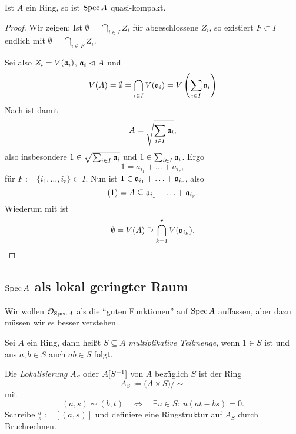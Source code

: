 \begin{satz}
	Ist $A$ ein Ring, so ist $\operatorname{Spec} A$ quasi-kompakt.
\end{satz}
\begin{proof}
	Wir zeigen: Ist $\emptyset = \bigcap_{i\in I} Z_i$ für abgeschlossene
	$Z_i$, so existiert $F\subset I$ endlich mit
	$\emptyset = \bigcap_{i\in F} Z_i$.
	
	Sei also $Z_i = V(\mathfrak{a}_i)$, $\mathfrak{a}_i \vartriangleleft A$ und
	\[
		V(A) = \emptyset = \bigcap_{i\in I} V(\mathfrak{a}_i)
		= V\left(\sum_{i\in I} \mathfrak{a}_i\right)
	\]
	Nach  ist damit
	\[
		A = \sqrt{\sum_{i\in I} \mathfrak{a}_i},
	\]
	also insbesondere $1 \in \sqrt{\sum_{i\in I} \mathfrak{a}_i}$ und
	$1 \in \sum_{i\in I} \mathfrak{a}_i$. Ergo
	\[
		1 = a_{i_1} + \ldots + a_{i_r},
	\]
	für $F:= \{i_1, \ldots, i_r\} \subset I$.
	Nun ist
	$1 \in \mathfrak{a}_{i_1} + \ldots + \mathfrak{a}_{i_r}$,
	also 
	\[
		(1) = A \subseteq \mathfrak{a}_{i_1} + \ldots + \mathfrak{a}_{i_r}.
	\]
	Wiederum mit  ist
	\[
		\emptyset = V(A) \supseteq \bigcap_{k=1}^r V(\mathfrak{a}_{i_k}).
	\] 
\end{proof}

\subsection{$\operatorname{Spec} A$ als lokal geringter Raum}

Wir wollen $\mathcal{O}_{\operatorname{Spec} A}$ als die "`guten Funktionen"' auf $\operatorname{Spec} A$ auffassen,
aber dazu müssen wir es besser verstehen. 

\begin{definition}
	\label{def:lokalisierung}
	Sei $A$ ein Ring, dann heißt $S\subseteq A$ \emph{multiplikative Teilmenge},
	wenn $1\in S$ ist und aus $a,b\in S$ auch $ab\in S$ folgt.
	
	Die \emph{Lokalisierung} $A_S$ oder $A[S^{-1}]$ von $A$ bezüglich $S$ ist
	der Ring
	\[
		A_S := \big(A \times S \big) \big/ \sim
	\]
	mit
	\[
		(a,s) \sim (b,t) \quad\Leftrightarrow\quad
		\exists u \in S:\ u(at - bs) = 0.
	\]
	Schreibe $\frac a s := [(a,s)]$ und definiere eine Ringstruktur auf
	$A_S$ durch Bruchrechnen.
\end{definition}

